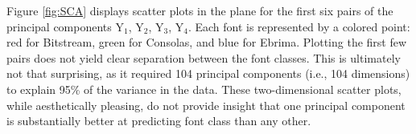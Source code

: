 \documentclass{homework}
\begin{document}
Figure \ref{fig:SCA} displays scatter plots in the plane for the first six pairs of the principal components Y$_1$, Y$_2$, Y$_3$, Y$_4$. Each font is represented by a colored point: red for Bitstream, green for Consolas, and blue for Ebrima. Plotting the first few pairs does not yield clear separation between the font classes. This is ultimately not that surprising, as it required 104 principal components (i.e., 104 dimensions) to explain 95\% of the variance in the data. These two-dimensional scatter plots, while aesthetically pleasing, do not provide insight that one principal component is substantially better at predicting font class than any other.
\pagebreak
\begin{figure}[h]
    \centering
    \\
    \\

\end{figure}
\end{document}
